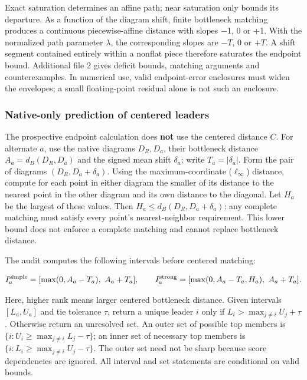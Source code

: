 \documentclass[
  11pt,
]{article}
\begin{document}
Exact saturation determines an affine path; near saturation only bounds
its departure. As a function of the diagram shift, finite bottleneck
matching produces a continuous piecewise-affine distance with slopes −1,
0 or +1. With the normalized path parameter \(\lambda\), the
corresponding slopes are \(-T\), 0 or \(+T\). A shift segment contained
entirely within a nonflat piece therefore saturates the endpoint bound.
Additional file 2 gives deficit bounds, matching arguments and
counterexamples. In numerical use, valid endpoint-error enclosures must
widen the envelopes; a small floating-point residual alone is not such
an enclosure.

\subsubsection{Native-only prediction of centered
leaders}\label{native-only-prediction-of-centered-leaders}

The prospective endpoint calculation does \textbf{not} use the centered
distance \(C\). For alternate \(a\), use the native diagrams
\(D_R,D_a\), their bottleneck distance \(A_a=d_B(D_R,D_a)\) and the
signed mean shift \(\delta_a\); write \(T_a=|\delta_a|\). Form the pair
of diagrams \((D_R,D_a+\delta_a)\). Using the maximum-coordinate
(\(\ell_\infty\)) distance, compute for each point in either diagram the
smaller of its distance to the nearest point in the other diagram and
its own distance to the diagonal. Let \(H_a\) be the largest of these
values. Then \(H_a\leq d_B(D_R,D_a+\delta_a)\): any complete matching
must satisfy every point's nearest-neighbor requirement. This lower
bound does not enforce a complete matching and cannot replace bottleneck
distance.

The audit computes the following intervals before centered matching:

\[
I_a^{\rm simple}=[\max(0,A_a-T_a),\ A_a+T_a],\qquad
I_a^{\rm strong}=[\max(0,A_a-T_a,H_a),\ A_a+T_a].
\]

Here, higher rank means larger centered bottleneck distance. Given
intervals \([L_a,U_a]\) and tie tolerance \(\tau\), return a unique
leader \(i\) only if \(L_i>\max_{j\ne i}U_j+\tau\). Otherwise return an
unresolved set. An outer set of possible top members is
\(\{i:U_i\geq\max_{j\ne i}L_j-\tau\}\); an inner set of necessary top
members is \(\{i:L_i\geq\max_{j\ne i}U_j-\tau\}\). The outer set need
not be sharp because score dependencies are ignored. All interval and
set statements are conditional on valid bounds.
\end{document}
